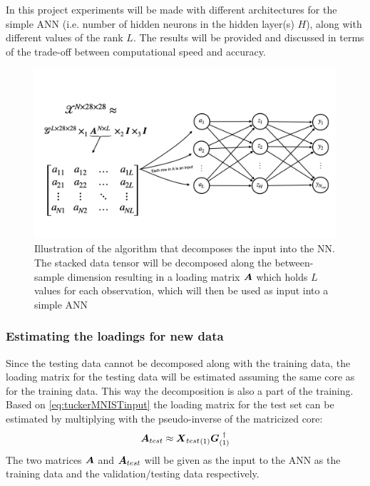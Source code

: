 In this project experiments will be made with different architectures for the simple ANN (i.e. number of hidden neurons in the hidden layer(s) $H$), along with different values of the rank $L$. The results will be provided and discussed in terms of the trade-off between computational speed and accuracy.

\begin{figure}
    \centering
    \includegraphics[width=\linewidth]{Pics/05_methodology/input_decomp_illustration.png}
    \captionsetup{width=.95\linewidth}
    \caption{Illustration of the algorithm that decomposes the input into the NN. The stacked data tensor will be decomposed along the between-sample dimension resulting in a loading matrix $\boldsymbol{A}$ which holds $L$ values for each observation, which will then be used as input into a simple ANN}
    \label{fig:illustrationinputdecomp}
\end{figure}

\subsubsection{Estimating the loadings for new data}
Since the testing data cannot be decomposed along with the training data, the loading matrix for the testing data will be estimated assuming the same core as for the training data. This way the decomposition is also a part of the training. Based on \eqref{eq:tuckerMNISTinput} the loading matrix for the test set can be estimated by multiplying with the pseudo-inverse of the matricized core:
\begin{equation}
    \boldsymbol{A}_{test} \approx {\boldsymbol{X}_{test}}_{(1)} \boldsymbol{G}_{(1)}^{\ \dagger}
\end{equation}
The two matrices $\boldsymbol{A}$ and $\boldsymbol{A}_{test}$ will be given as the input to the ANN as the training data and the validation/testing data respectively.


